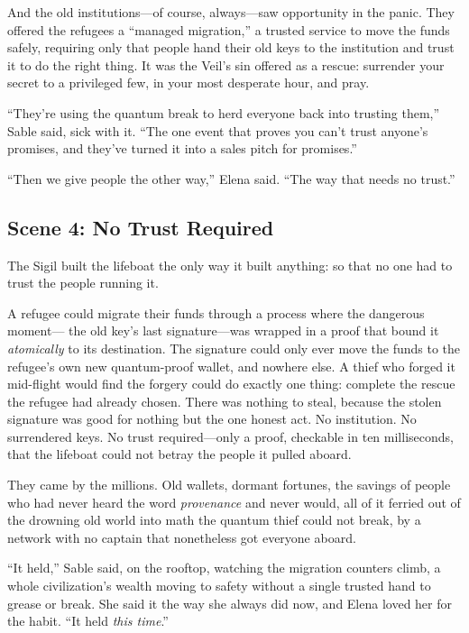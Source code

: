 And the old institutions---of course, always---saw opportunity in the panic. They
offered the refugees a ``managed migration,'' a trusted service to move the funds
safely, requiring only that people hand their old keys to the institution and trust
it to do the right thing. It was the Veil's sin offered as a rescue: surrender your
secret to a privileged few, in your most desperate hour, and pray.

``They're using the quantum break to herd everyone back into trusting them,'' Sable
said, sick with it. ``The one event that proves you can't trust anyone's promises,
and they've turned it into a sales pitch for promises.''

``Then we give people the other way,'' Elena said. ``The way that needs no trust.''

\hypertarget{scene-4-no-trust-required}{%
\subsection{Scene 4: No Trust
Required}\label{scene-4-no-trust-required}}

The Sigil built the lifeboat the only way it built anything: so that no one had to
trust the people running it.

A refugee could migrate their funds through a process where the dangerous moment---
the old key's last signature---was wrapped in a proof that bound it
\emph{atomically} to its destination. The signature could only ever move the funds
to the refugee's own new quantum-proof wallet, and nowhere else. A thief who forged
it mid-flight would find the forgery could do exactly one thing: complete the rescue
the refugee had already chosen. There was nothing to steal, because the stolen
signature was good for nothing but the one honest act. No institution. No
surrendered keys. No trust required---only a proof, checkable in ten milliseconds,
that the lifeboat could not betray the people it pulled aboard.

They came by the millions. Old wallets, dormant fortunes, the savings of people who
had never heard the word \emph{provenance} and never would, all of it ferried out
of the drowning old world into math the quantum thief could not break, by a network
with no captain that nonetheless got everyone aboard.

``It held,'' Sable said, on the rooftop, watching the migration counters climb, a
whole civilization's wealth moving to safety without a single trusted hand to grease
or break. She said it the way she always did now, and Elena loved her for the habit.
``It held \emph{this time}.''

